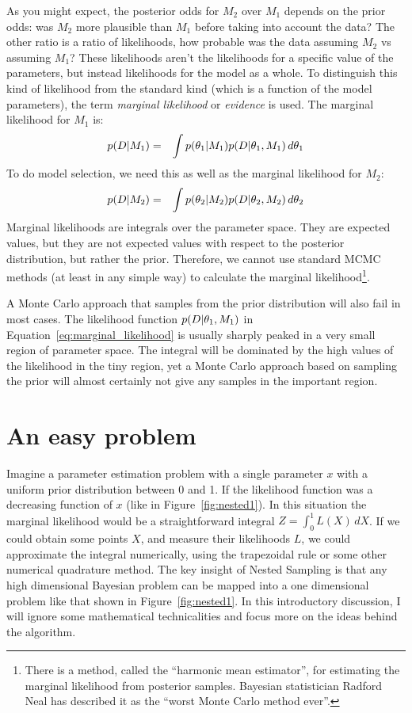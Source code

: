 As you might expect, the posterior odds for $M_2$ over $M_1$ depends on the
prior odds: was $M_2$ more plausible than $M_1$ before taking into account the
data? The other ratio is a ratio of likelihoods, how probable was the data
assuming $M_2$ vs assuming $M_1$? These likelihoods aren't the likelihoods
for a specific value of the parameters, but instead likelihoods for the model
as a whole. To distinguish this kind of likelihood from the standard kind (which
is a function of the model parameters), the term {\it marginal likelihood} or
{\it evidence} is used. The marginal likelihood for $M_1$ is:
\begin{eqnarray}
p(D | M_1) &=& \int p(\theta_1 | M_1) p(D | \theta_1, M_1) \, d\theta_1
\label{eq:marginal_likelihood}
\end{eqnarray}
To do model selection, we need this as well as the marginal likelihood for
$M_2$:
\begin{eqnarray}
p(D | M_2) &=& \int p(\theta_2 | M_2) p(D | \theta_2, M_2) \, d\theta_2
\end{eqnarray}
Marginal likelihoods are integrals over the parameter space. They are
expected values, but they are not expected values with respect to the posterior
distribution, but rather the prior. Therefore, we cannot use standard MCMC
methods (at least in any simple way) to calculate the marginal
likelihood\footnote{There is a method, called the ``harmonic mean estimator'',
for estimating the marginal likelihood from posterior samples. Bayesian
statistician Radford Neal has described it as the
``worst Monte Carlo method ever''.}.

A Monte Carlo approach that samples from the prior distribution will also fail
in most cases. The likelihood function $p(D | \theta_1, M_1)$ in
Equation~\ref{eq:marginal_likelihood} is usually sharply peaked in a very
small region of parameter space. The integral will be dominated by the high values
of the likelihood in the tiny region, yet a Monte Carlo approach based on
sampling the prior will almost certainly not give any samples in the important
region.

\section{An easy problem}
Imagine a parameter estimation problem with a single parameter $x$ with a
uniform prior distribution between 0 and 1. If the likelihood function was a
decreasing function of $x$ (like in Figure~\ref{fig:nested1}). In this
situation the marginal likelihood would be a straightforward integral
$Z = \int_0^1 L(X) \,dX$. If we could obtain some points $X$, and measure their
likelihoods $L$, we could approximate the integral numerically, using the
trapezoidal rule or some other numerical quadrature method.
The key insight of Nested Sampling is that any high dimensional Bayesian
problem can be mapped into a one dimensional problem like that shown in
Figure~\ref{fig:nested1}. In this introductory discussion, I will ignore some
mathematical technicalities and focus more on the ideas behind the algorithm.

